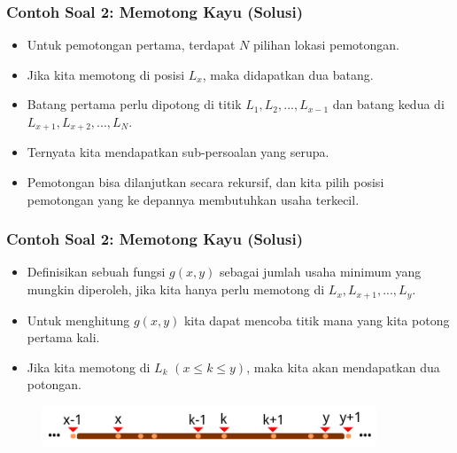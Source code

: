 \begin{frame}
\frametitle{Contoh Soal 2: Memotong Kayu (Solusi)}
\begin{itemize}
  \item Untuk pemotongan pertama, terdapat $N$ pilihan lokasi pemotongan.
  \item Jika kita memotong di posisi $L_x$, maka didapatkan dua batang.
  \item Batang pertama perlu dipotong di titik $L_1, L_2, ..., L_{x-1}$ dan batang kedua di $L_{x+1}, L_{x+2}, ..., L_N$.
  \item Ternyata kita mendapatkan sub-persoalan yang serupa.
  \item Pemotongan bisa dilanjutkan secara rekursif, dan kita pilih posisi pemotongan yang ke depannya membutuhkan usaha terkecil.
\end{itemize}
\end{frame}

\begin{frame}
\frametitle{Contoh Soal 2: Memotong Kayu (Solusi)}
\begin{itemize}
  \item Definisikan sebuah fungsi $g(x,y)$ sebagai jumlah usaha minimum yang mungkin diperoleh, jika kita hanya perlu memotong di $L_{x}, L_{x+1}, ..., L_{y}$.
  \item Untuk menghitung $g(x,y)$ kita dapat mencoba titik mana yang kita potong pertama kali.
  \item Jika kita memotong di $L_k$ $(x \leq k \leq y)$, maka kita akan mendapatkan dua potongan.
\end{itemize}
\begin{figure}
  \includegraphics[width=10cm]{asset/cutting-stick-4.pdf}
\end{figure}
\end{frame}

